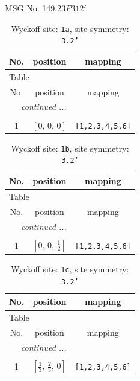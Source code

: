 \documentclass[fleqn,8pt]{jsarticle}
\begin{document}
\setcounter{MaxMatrixCols}{32}

\renewcommand{\tablename}{Table~}
\renewcommand{\figurename}{Figure~}
\begin{center}
\LARGE
MSG No. 149.23\quad$P312'$
\end{center}
\renewcommand{\arraystretch}{1.2}
\begin{longtable}{ccc}
\caption{Wyckoff site: {\tt 1a}, site symmetry: {\tt 3.2'}}
 \\
 \hline \hline
No. & position & mapping \\ \hline \endfirsthead

\multicolumn{2}{l}{\tablename\ \thetable{}} \\
 \hline \hline
No. & position & mapping \\ \hline \endhead

 \hline \hline
\multicolumn{2}{r}{\footnotesize\it continued ...} \\ \endfoot

 \hline \hline
\multicolumn{2}{r}{} \\ \endlastfoot

1 & $\left[ 0,\, 0,\, 0 \right]$ & {\tt [1,2,3,4,5,6]} \\
\end{longtable}
\renewcommand{\arraystretch}{1.2}
\begin{longtable}{ccc}
\caption{Wyckoff site: {\tt 1b}, site symmetry: {\tt 3.2'}}
 \\
 \hline \hline
No. & position & mapping \\ \hline \endfirsthead

\multicolumn{2}{l}{\tablename\ \thetable{}} \\
 \hline \hline
No. & position & mapping \\ \hline \endhead

 \hline \hline
\multicolumn{2}{r}{\footnotesize\it continued ...} \\ \endfoot

 \hline \hline
\multicolumn{2}{r}{} \\ \endlastfoot

1 & $\left[ 0,\, 0,\, \frac{1}{2} \right]$ & {\tt [1,2,3,4,5,6]} \\
\end{longtable}
\renewcommand{\arraystretch}{1.2}
\begin{longtable}{ccc}
\caption{Wyckoff site: {\tt 1c}, site symmetry: {\tt 3.2'}}
 \\
 \hline \hline
No. & position & mapping \\ \hline \endfirsthead

\multicolumn{2}{l}{\tablename\ \thetable{}} \\
 \hline \hline
No. & position & mapping \\ \hline \endhead

 \hline \hline
\multicolumn{2}{r}{\footnotesize\it continued ...} \\ \endfoot

 \hline \hline
\multicolumn{2}{r}{} \\ \endlastfoot

1 & $\left[ \frac{1}{3},\, \frac{2}{3},\, 0 \right]$ & {\tt [1,2,3,4,5,6]} \\
\end{longtable}
\end{document}
